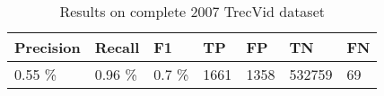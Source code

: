 













\begin{table}[ht]
	\centering
	\begin{tabular}{l|l|l||l|l|l|l}
	Precision & Recall & F1 & TP & FP & TN & FN \\ \hline
	0.55 \% & 0.96 \% & 0.7 \% & 1661 & 1358 & 532759 & 69 \\
	\end{tabular}

	\caption{Results on complete 2007 TrecVid dataset}
	\label{tab:hard_cut_results}
\end{table}


